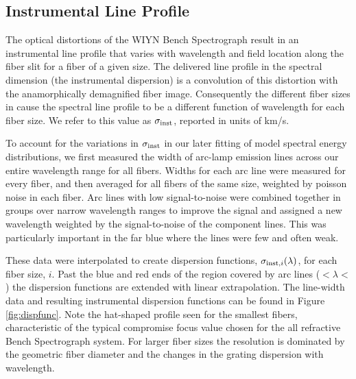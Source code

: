 \subsection{Instrumental Line Profile}
\label{sec:GPak_dispersion}

The optical distortions of the WIYN Bench Spectrograph result in an
instrumental line profile that varies with wavelength and field
location along the fiber slit for a fiber of a given size. The
delivered line profile in the spectral dimension (the instrumental
dispersion) is a convolution of this distortion with the
anamorphically demagnified fiber image. Consequently the different
fiber sizes in \GP cause the spectral line profile to be a different
function of wavelength for each fiber size. We refer to this value as
$\sigma_{\rm inst}$, reported in units of km/s.

To account for the variations in $\sigma_{\rm inst}$ in our later
fitting of model spectral energy distributions, we first measured the
width of arc-lamp emission lines across our entire wavelength range
for all fibers. Widths for each arc line were measured for every
fiber, and then averaged for all fibers of the same size, weighted by
poisson noise in each fiber. Arc lines with low signal-to-noise were
combined together in groups over narrow wavelength ranges to improve
the signal and assigned a new wavelength weighted by the
signal-to-noise of the component lines. This was particularly
important in the far blue where the lines were few and often
weak.

These data were interpolated to create dispersion functions,
$\sigma_{{\rm inst},i}(\lambda)$, for each fiber size, $i$. Past the
blue and red ends of the region covered by arc lines
($<\lambda <$ ) the dispersion functions
are extended with linear extrapolation. The line-width data and
resulting instrumental dispersion functions can be found in Figure
\ref{fig:dispfunc}. Note the hat-shaped profile seen for the smallest
fibers, characteristic of the typical compromise focus value chosen
for the all refractive Bench Spectrograph system. For larger fiber
sizes the resolution is dominated by the geometric fiber diameter and
the changes in the grating dispersion with wavelength.


